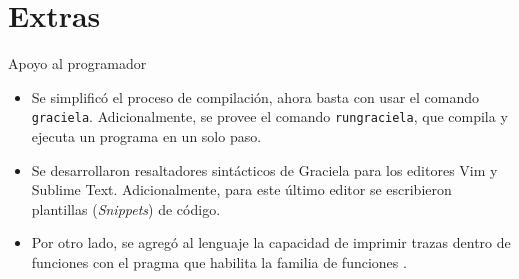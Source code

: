 \section{Extras}

\pragma{
\begin{lstlisting}[language=graciela, style=code, escapechar=\~]
/*% LANGUAGE Trace %*/
\end{lstlisting}
}

\begin{frame}{Apoyo al programador}
\begin{itemize}
  \item Se simplificó el proceso de compilación, ahora basta con usar el comando \texttt{graciela}. Adicionalmente, se provee el comando \texttt{rungraciela}, que compila y ejecuta un programa en un solo paso.
  \item Se desarrollaron resaltadores sintácticos de Graciela para los editores Vim y Sublime Text. Adicionalmente, para este último editor se escribieron plantillas (\textit{Snippets}) de código.
  \item Por otro lado, se agregó al lenguaje la capacidad de imprimir trazas dentro de funciones con el pragma
  \pragma
  que habilita la familia de funciones .
\end{itemize}
\end{frame}

